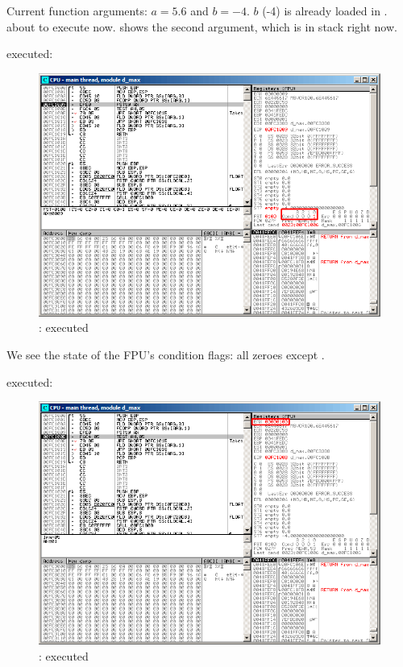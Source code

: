 Current function arguments: $a=5.6$ and $b=-4$.
$b$ (-4) is already loaded in .
\FCOMP about to execute now. 
\olly shows the second \FCOMP argument, which is in stack right now.

\clearpage
\FCOMP executed:

\begin{figure}[H]
\centering
\includegraphics[scale=\FigScale]{patterns/12_FPU/3_comparison/x86/MSVC/olly2_2.png}
\caption{\olly: \FCOMP executed}
\label{fig:FPU_comparison_case2_olly2}
\end{figure}

We see the state of the \ac{FPU}'s condition flags: all zeroes except \Czero.

\clearpage
\FNSTSW executed:

\begin{figure}[H]
\centering
\includegraphics[scale=\FigScale]{patterns/12_FPU/3_comparison/x86/MSVC/olly2_3.png}
\caption{\olly: \FNSTSW executed}
\label{fig:FPU_comparison_case2_olly3}
\end{figure}

